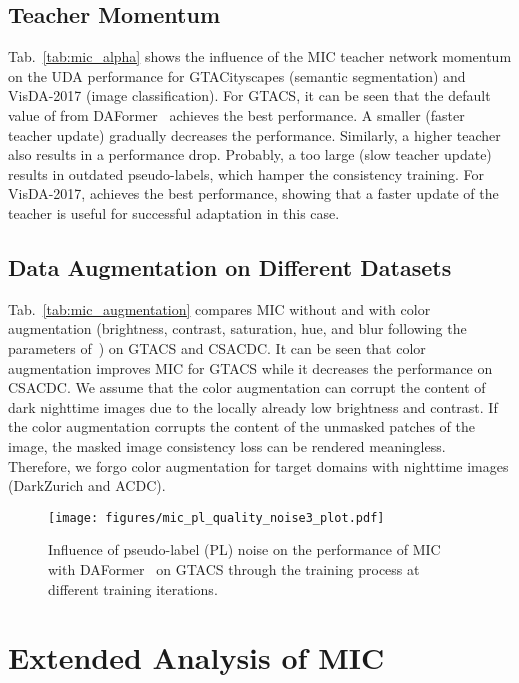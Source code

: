 \documentclass[10pt,twocolumn,letterpaper]{article}
\begin{document}
\subsection{Teacher Momentum }

Tab.~\ref{tab:mic_alpha} shows the influence of the MIC teacher network momentum  on the UDA performance for GTACityscapes (semantic segmentation) and VisDA-2017 (image classification). For GTACS, it can be seen that the default value of  from DAFormer~\cite{hoyer2021daformer} achieves the best performance. A smaller  (faster teacher update) gradually decreases the performance. Similarly, a higher teacher  also results in a performance drop. Probably, a too large  (slow teacher update) results in outdated pseudo-labels, which hamper the consistency training. For VisDA-2017,  achieves the best performance, showing that a faster update of the teacher is useful for successful adaptation in this case.


\subsection{Data Augmentation on Different Datasets}

Tab.~\ref{tab:mic_augmentation} compares MIC without and with color augmentation (brightness, contrast, saturation, hue, and blur following the parameters of~\cite{tranheden2021dacs,hoyer2021daformer,hoyer2022hrda}) on GTACS and CSACDC. It can be seen that color augmentation improves MIC for GTACS while it decreases the performance on CSACDC. We assume that the color augmentation can corrupt the content of dark nighttime images due to the locally already low brightness and contrast. If the color augmentation corrupts the content of the unmasked patches of the image, the masked image consistency loss can be rendered meaningless. Therefore, we forgo color augmentation for target domains with nighttime images (DarkZurich and ACDC).





\begin{figure}
    \centering
    \texttt{[image: figures/mic\_pl\_quality\_noise3\_plot.pdf]}
    \caption{Influence of pseudo-label (PL) noise on the performance of MIC with DAFormer~\cite{hoyer2021daformer} on GTACS through the training process at different training iterations.}
    \label{fig:pseudo_label_quality}
\end{figure}

\section{Extended Analysis of MIC}
\label{sec:supp_extended_analysis}
\end{document}
